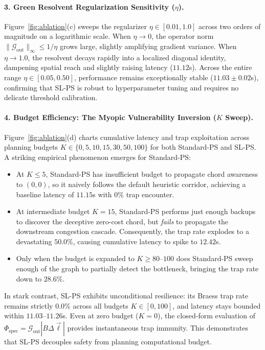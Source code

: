 \documentclass[11pt,a4paper]{article}
\begin{document}
\paragraph{3. Green Resolvent Regularization Sensitivity ($\eta$).}
Figure~\ref{fig:ablation}(c) sweeps the regularizer $\eta \in [0.01, 1.0]$ across two orders of magnitude on a logarithmic scale. When $\eta \to 0$, the operator norm $\|\mathcal{G}_{\text{out}}\|_\infty \le 1/\eta$ grows large, slightly amplifying gradient variance. When $\eta \to 1.0$, the resolvent decays rapidly into a localized diagonal identity, dampening spatial reach and slightly raising latency ($11.12$s). Across the entire range $\eta \in [0.05, 0.50]$, performance remains exceptionally stable ($11.03 \pm 0.02$s), confirming that SL-PS is robust to hyperparameter tuning and requires no delicate threshold calibration.

\paragraph{4. Budget Efficiency: The Myopic Vulnerability Inversion ($K$ Sweep).}
Figure~\ref{fig:ablation}(d) charts cumulative latency and trap exploitation across planning budgets $K \in \{0, 5, 10, 15, 30, 50, 100\}$ for both Standard-PS and SL-PS. A striking empirical phenomenon emerges for Standard-PS:
\begin{itemize}
    \item At $K \le 5$, Standard-PS has insufficient budget to propagate chord awareness to $(0, 0)$, so it naively follows the default heuristic corridor, achieving a baseline latency of $11.15$s with $0\%$ trap encounter.
    \item At intermediate budget $K = 15$, Standard-PS performs just enough backups to discover the deceptive zero-cost chord, but \textit{fails} to propagate the downstream congestion cascade. Consequently, the trap rate explodes to a devastating $\mathbf{50.0\%}$, causing cumulative latency to spike to $\mathbf{12.42}$s.
    \item Only when the budget is expanded to $K \ge 80$--$100$ does Standard-PS sweep enough of the graph to partially detect the bottleneck, bringing the trap rate down to $28.6\%$.
\end{itemize}
In stark contrast, SL-PS exhibits unconditional resilience: its Braess trap rate remains strictly $\mathbf{0.0\%}$ across all budgets $K \in [0, 100]$, and latency stays bounded within $11.03$--$11.26$s. Even at zero budget ($K = 0$), the closed-form evaluation of $\Phi_{\text{spec}} = \mathcal{G}_{\text{out}} |B \Delta \vec{\ell}|$ provides instantaneous trap immunity. This demonstrates that SL-PS decouples safety from planning computational budget.
\end{document}
